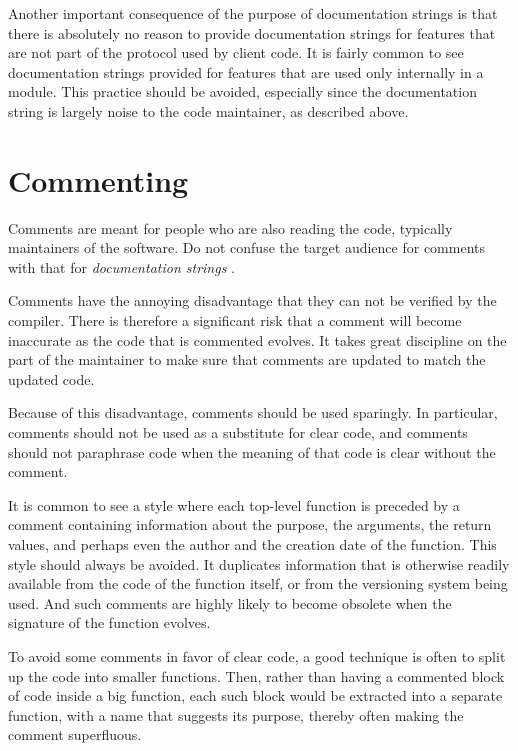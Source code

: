 Another important consequence of the purpose of documentation strings
is that there is absolutely no reason to provide documentation strings
for features that are not part of the protocol used by client code.
It is fairly common to see documentation strings provided for features
that are used only internally in a module.  This practice should be
avoided, especially since the documentation string is largely noise to
the code maintainer, as described above.

\section{Commenting}
\label{sec-general-coding-style-commenting}

Comments are meant for people who are also reading the code, typically
maintainers of the software.  Do not confuse the target audience for
comments with that for \emph{documentation strings}
.

Comments have the annoying disadvantage that they can not be verified
by the compiler.  There is therefore a significant risk that a comment
will become inaccurate as the code that is commented evolves.  It
takes great discipline on the part of the maintainer to make sure that
comments are updated to match the updated code.

Because of this disadvantage, comments should be used sparingly.  In
particular, comments should not be used as a substitute for clear
code, and comments should not paraphrase code when the meaning of that
code is clear without the comment.

It is common to see a style where each top-level function is preceded
by a comment containing information about the purpose, the arguments,
the return values, and perhaps even the author and the creation date
of the function.  This style should always be avoided.  It duplicates
information that is otherwise readily available from the code of the
function itself, or from the versioning system being used.  And such
comments are highly likely to become obsolete when the signature of
the function evolves.

To avoid some comments in favor of clear code, a good technique is
often to split up the code into smaller functions.  Then, rather than
having a commented block of code inside a big function, each such
block would be extracted into a separate function, with a name that
suggests its purpose, thereby often making the comment superfluous.

